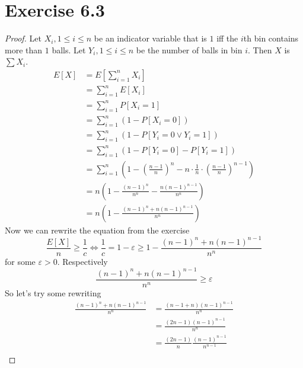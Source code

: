 \documentclass[10pt,a4paper]{article}
\begin{document}
\section*{Exercise 6.3}

\begin{proof}
  Let $X_{i}, 1 \le i \le n$ be an indicator variable that is $1$ iff the $i$th bin contains more than $1$ balls.
  Let $Y_{i}, 1 \le i \le n$ be the number of balls in bin $i$.
  Then $X$ is $\sum X_{i}$.
  \begin{align*}
    E[X] & = E\left[ \sum_{i = 1}^{n} X_{i} \right]\\
         & = \sum_{i = 1}^{n} E[X_{i}] \\
         & = \sum_{i = 1}^{n} P[X_{i} = 1] \\
         & = \sum_{i = 1}^{n} \left( 1 - P[X_{i} = 0] \right) \\
         & = \sum_{i = 1}^{n} \left( 1 - P[Y_{i} = 0 \lor Y_{i} = 1] \right) \\
         & = \sum_{i = 1}^{n} \left( 1 - P[Y_{i} = 0] - P[Y_{i} = 1] \right) \\
         & = \sum_{i = 1}^{n} \left( 1 - \left( \frac{n - 1}{n} \right)^{n} - n \cdot \frac{1}{n} \cdot \left( \frac{n - 1}{n} \right)^{n - 1} \right)\\
         & = n \left( 1 - \frac{(n - 1)^{n}}{n^{n}} - \frac{n(n - 1)^{n - 1}}{n^{n}} \right)\\
         & = n \left( 1 - \frac{(n - 1)^{n} + n(n - 1)^{n - 1}}{n^{n}} \right)
  \end{align*}
  Now we can rewrite the equation from the exercise
  \begin{equation*}
    \frac{E[X]}{n} \ge \frac{1}{c} \Leftrightarrow \frac{1}{c} = 1 - \varepsilon \ge 1 - \frac{(n - 1)^{n} + n(n - 1)^{n - 1}}{n^{n}}
  \end{equation*}
  for some $\varepsilon > 0$.
  Respectively
  \begin{equation*}
    \frac{(n - 1)^{n} + n(n - 1)^{n - 1}}{n^{n}} \ge \varepsilon
  \end{equation*}
  So let's try some rewriting
  \begin{align*}
    \frac{(n - 1)^{n} + n(n - 1)^{n - 1}}{n^{n}} & = \frac{\left( n - 1 + n \right)(n - 1)^{n - 1}}{n^{n}}\\
                                                 & = \frac{(2n - 1) (n - 1)^{n - 1}}{n^{n}}\\
                                                 & = \frac{(2n - 1)}{n} \frac{(n - 1)^{n - 1}}{n^{n - 1}}\\

\end{align*}
\end{proof}
\end{document}

